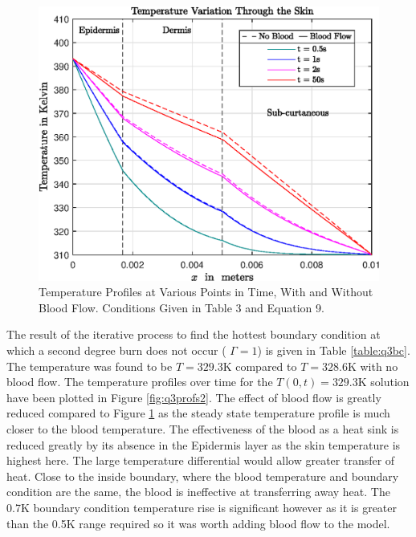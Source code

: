 \documentclass[11pt]{article}
\begin{document}
\begin{figure}[!h]  %
	\centering
	\includegraphics[width=.75\textwidth]{epsQ3Profiles}
    \caption{Temperature Profiles at Various Points in Time, With and Without Blood Flow. Conditions Given in Table 3 and Equation 9.}\label{fig:q3profs}
\end{figure}
\FloatBarrier


 The result of the iterative process to find the hottest boundary condition at which a second degree burn does not occur ( $\Gamma  = 1$) is given in Table \ref{table:q3bc}. The temperature was found to be $T = 329.3$K compared to $T = 328.6$K with no blood flow. The temperature profiles over time for the \mbox{$T(0,t) = 329.3$K} solution have been plotted in Figure \ref{fig:q3profs2}. The effect of blood flow is greatly reduced compared to Figure \ref{fig:q3profs} as the steady state temperature profile is much closer to the blood temperature. The effectiveness of the blood as a heat sink is reduced greatly by its absence in the Epidermis layer as the skin temperature is highest here. The large temperature differential would allow greater transfer of heat. Close to the inside boundary, where the blood temperature and boundary condition are the same, the blood is ineffective at transferring away heat. The 0.7K boundary condition temperature rise is significant however as it is greater than the 0.5K range required so it was worth adding blood flow to the model. 
\end{document}
